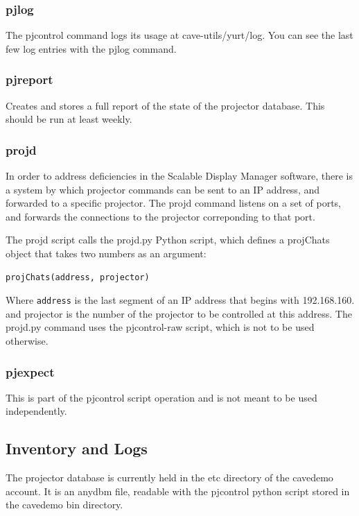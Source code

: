 \documentclass[11pt]{article}
\newcommand{\cmd}[1]{\texttt{#1}}
\begin{document}
\subsubsection{pjlog}

The pjcontrol command logs its usage at cave-utils/yurt/log.
You can see the last few log entries with the pjlog command.

\subsubsection{pjreport}

Creates and stores a full report of the state of the projector
database.  This should be run at least weekly.

\subsubsection{projd}

In order to address deficiencies in the Scalable Display Manager
software, there is a system by which projector commands can be sent to
an IP address, and forwarded to a specific projector.  The projd
command listens on a set of ports, and forwards the connections to the
projector correponding to that port.

The projd script calls the projd.py Python script, which defines a
projChats object that takes two numbers as an argument:

\begin{verbatim}
projChats(address, projector)
\end{verbatim}

Where \cmd{address} is the last segment of an IP address that begins
with 192.168.160. and projector is the number of the projector to be
controlled at this address.  The projd.py command uses the
pjcontrol-raw script, which is not to be used otherwise.

\subsubsection{pjexpect}

This is part of the pjcontrol script operation and is not meant to be
used independently.


\subsection{Inventory and Logs}
\label{logging}

The projector database is currently held in the etc directory of the
cavedemo account.  It is an anydbm file, readable with the pjcontrol
python script stored in the cavedemo bin directory.
\end{document}
